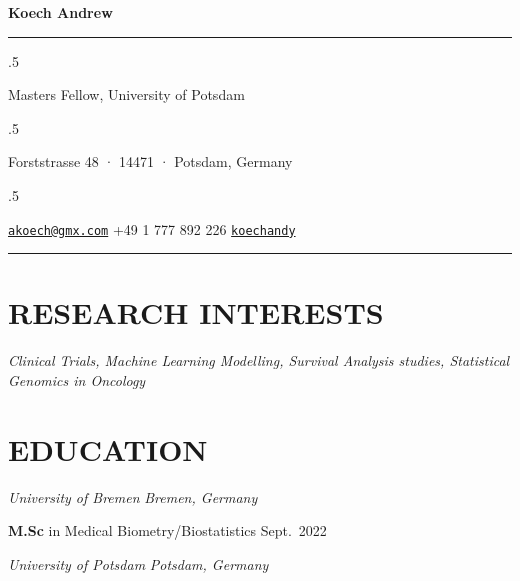 \documentclass[13pt,]{article}
\providecommand{\tightlist}{%
  \setlength{\itemsep}{0pt}\setlength{\parskip}{0pt}}
\renewenvironment{itemize}{
  \begin{list}{}{
    \setlength{\leftmargin}{1.5em}
  }
}{
  \end{list}
}
\begin{document}
\centerline{\huge \bf Koech Andrew}

\vspace{2 mm}

\hrule

\vspace{2 mm}

\moveleft.5\hoffset\centerline{Masters Fellow, University of Potsdam}
\moveleft.5\hoffset\centerline{Forststrasse 48 · 14471 · Potsdam,
Germany}
\moveleft.5\hoffset\centerline{ \faEnvelopeO \hspace{1 mm} \href{mailto:}{\tt \href{mailto:akoech@gmx.com}{\nolinkurl{akoech@gmx.com}}} \hspace{1 mm}  \faPhone \hspace{1 mm}  +49
1 777 892
226  \hspace{1 mm}  \faGithub \hspace{1 mm} \href{http://github.com/koechandy}{\tt koechandy} \hspace{1 mm}      } 

\vspace{2 mm}

\hrule


\hypertarget{research-interests}{%
\section{\texorpdfstring{\textbf{RESEARCH
INTERESTS}}{RESEARCH INTERESTS}}\label{research-interests}}

\begin{itemize}
\tightlist
\item
  \emph{Clinical Trials, Machine Learning Modelling, Survival Analysis
  studies, Statistical Genomics in Oncology}
\end{itemize}

\hypertarget{education}{%
\section{\texorpdfstring{\textbf{EDUCATION}}{EDUCATION}}\label{education}}

\emph{University of Bremen} \hfill \emph{Bremen, Germany}

\begin{itemize}
\tightlist
\item
  \textbf{M.Sc} in Medical Biometry/Biostatistics \hfill Sept.~2022
\end{itemize}

\emph{University of Potsdam} \hfill \emph{Potsdam, Germany}
\end{document}
